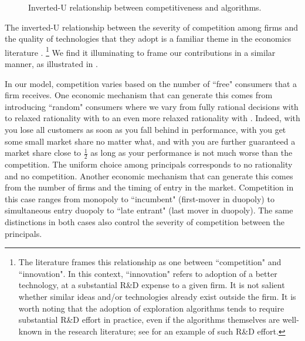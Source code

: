 \begin{figure}
\begin{center}

\caption{Inverted-U relationship between competitiveness and algorithms.}
\label{fig:inverted-U}
\end{center}
\end{figure}
The inverted-U relationship between the severity of competition among firms and the quality of technologies that they adopt is a familiar theme in the economics literature \citep[\eg][]{Aghion-QJE05,Vives-08}.%
\footnote{The literature frames this relationship as one between ``competition" and ``innovation". In this context, ``innovation" refers to adoption of a better technology, at a substantial R\&D expense to a given firm. It is not salient whether similar ideas and/or technologies already exist outside the firm. It is worth noting that the adoption of exploration algorithms tends to require substantial R\&D effort in practice, even if the algorithms themselves are well-known in the research literature; see \citet{MWT-WhitePaper-2016} for an example of such R\&D effort.}
We find it illuminating to frame our contributions in a similar manner, as illustrated in .

In our model, competition varies based on the number of ``free" consumers that a firm receives. One economic mechanism that can generate this comes from introducing ``random" consumers where we vary from fully rational decisions with \HardMax to relaxed rationality with \HardMaxRandom to an even more relaxed rationality with \SoftMaxRandom. Indeed, with \HardMax you lose all customers as soon as you fall behind in performance, with \HardMaxRandom you get some small market share no matter what, and with \SoftMaxRandom you are further guaranteed a market share close to $\tfrac12$ as long as your performance is not much worse than the competition. The uniform choice among principals corresponds to no rationality and no competition. Another economic mechanism that can generate this comes from the number of firms and the timing of entry in the market. Competition in this case ranges from monopoly to ``incumbent" (first-mover in duopoly) to simultaneous entry duopoly to ``late entrant" (last mover in duopoly). The same distinctions in both cases also control the severity of competition between the principals.

